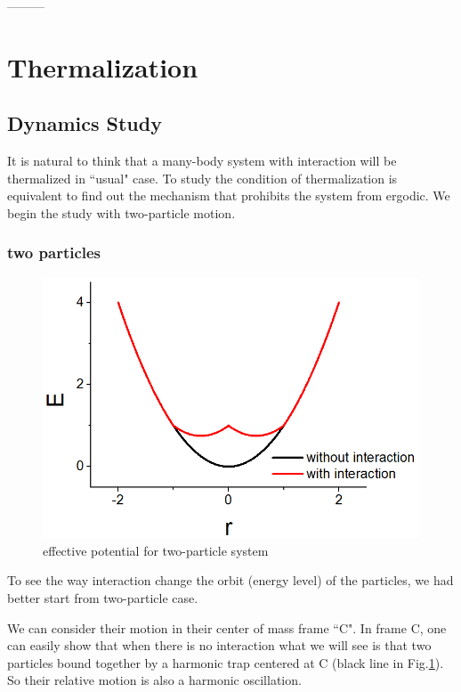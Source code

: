 \documentclass[aps,preprintnumbers,onecolumn,amsmath,amssymb,floatfix,pra]{revtex4-1}
\begin{document}
---------




\section{Thermalization}\label{section:Thermalization}
\subsection{Dynamics Study}
It is natural to think that a many-body system with interaction will be thermalized in ``usual" case. To study the condition of thermalization is equivalent to find out the mechanism that prohibits the system from ergodic. We begin the study with two-particle motion. 
\subsubsection{two particles}

\begin{figure}[h]
\centering
\includegraphics[scale=0.2]{ZhiyuPictures/effective_potential.png}
\caption{effective potential for two-particle system}
\label{fig:thermalization2}
\end{figure}

To see the way interaction change the orbit (energy level) of the particles, we had better start from two-particle case.

We can consider their motion in their center of mass frame ``C". In frame C, one can easily show that when there is no interaction what we will see is that two particles bound together by a harmonic trap centered at C (black line in Fig.\ref{fig:thermalization2}). So their relative motion is also a harmonic oscillation. 
\end{document}
